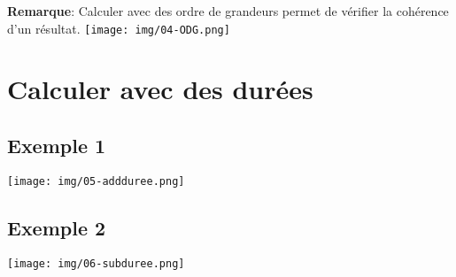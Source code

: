 \documentclass[12pt,a4paper]{article}
\begin{document}
\textbf{Remarque}: Calculer avec des ordre de grandeurs permet de vérifier la cohérence d'un résultat.
\ifdefined\isprof
	\texttt{[image: img/04-ODG.png]}  
\else
	\vspace{8cm}
\fi

\section{Calculer avec des durées}
\subsection{Exemple 1}
\ifdefined\isprof
\texttt{[image: img/05-addduree.png]} 
\else
	\vspace{8cm}
\fi
\subsection{Exemple 2}
\ifdefined\isprof
\texttt{[image: img/06-subduree.png]} 
\else
	\vspace{8cm}
\fi
\end{document}
